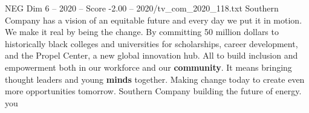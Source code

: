 \begin{textsample}{NEG Dim 6 – 2020 – Score -2.00 – 2020/tv\_com\_2020\_118.txt}  \label{ex:f6_neg_052}
Southern Company has a vision of an equitable future and every day we put it in motion.
We make it real by being the change.
By committing 50 million dollars to historically black colleges and universities for scholarships, career development, and the Propel Center, a new global innovation hub.
All to build inclusion and empowerment both in our workforce and our \textbf{community}.
It means bringing thought leaders and young \textbf{minds} together.
Making change today to create even more opportunities tomorrow.
Southern Company building the future of energy. you

\end{textsample}
